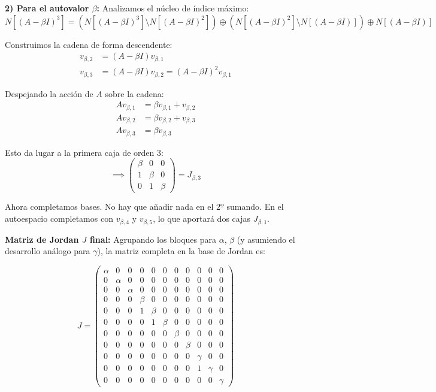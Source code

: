 {    \textbf{2) Para el autovalor $\beta$:}
    Analizamos el núcleo de índice máximo:
    \[
        N[(A-\beta I)^3] = \left( N[(A-\beta I)^3] \setminus N[(A-\beta I)^2] \right) \oplus \left( N[(A-\beta I)^2] \setminus N[(A-\beta I)] \right) \oplus N[(A-\beta I)]
    \]

    Construimos la cadena de forma descendente:
    \begin{align*}
        v_{\beta,2} &= (A-\beta I)v_{\beta,1} \\
        v_{\beta,3} &= (A-\beta I)v_{\beta,2} = (A-\beta I)^2 v_{\beta,1}
    \end{align*}

    Despejando la acción de $A$ sobre la cadena:
    \begin{align*}
        A v_{\beta,1} &= \beta v_{\beta,1} + v_{\beta,2} \\
        A v_{\beta,2} &= \beta v_{\beta,2} + v_{\beta,3} \\
        A v_{\beta,3} &= \beta v_{\beta,3}
    \end{align*}

    Esto da lugar a la primera caja de orden 3:
    \[
        \implies \begin{pmatrix} \beta & 0 & 0 \\ 1 & \beta & 0 \\ 0 & 1 & \beta \end{pmatrix} = J_{\beta,3}
    \]

    Ahora completamos bases. No hay que añadir nada en el $2º$ sumando. En el autoespacio completamos con $v_{\beta,4}$ y $v_{\beta,5}$, lo que aportará dos cajas $J_{\beta,1}$.

    \textbf{Matriz de Jordan $J$ final:}
    Agrupando los bloques para $\alpha$, $\beta$ (y asumiendo el desarrollo análogo para $\gamma$), la matriz completa en la base de Jordan es:

    \[
    J = \left(
    \begin{array}{ccc|ccccc|ccc}
    \alpha & 0 & 0 & 0 & 0 & 0 & 0 & 0 & 0 & 0 & 0 \\
    0 & \alpha & 0 & 0 & 0 & 0 & 0 & 0 & 0 & 0 & 0 \\
    0 & 0 & \alpha & 0 & 0 & 0 & 0 & 0 & 0 & 0 & 0 \\
    \hline
    0 & 0 & 0 & \beta & 0 & 0 & 0 & 0 & 0 & 0 & 0 \\
    0 & 0 & 0 & 1 & \beta & 0 & 0 & 0 & 0 & 0 & 0 \\
    0 & 0 & 0 & 0 & 1 & \beta & 0 & 0 & 0 & 0 & 0 \\
    0 & 0 & 0 & 0 & 0 & 0 & \beta & 0 & 0 & 0 & 0 \\
    0 & 0 & 0 & 0 & 0 & 0 & 0 & \beta & 0 & 0 & 0 \\
    \hline
    0 & 0 & 0 & 0 & 0 & 0 & 0 & 0 & \gamma & 0 & 0 \\
    0 & 0 & 0 & 0 & 0 & 0 & 0 & 0 & 1 & \gamma & 0 \\
    0 & 0 & 0 & 0 & 0 & 0 & 0 & 0 & 0 & 0 & \gamma
    \end{array}
    \right)
    \]
}



